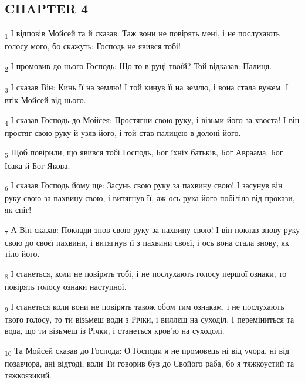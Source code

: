 \subsection{CHAPTER 4}
\begin{tcolorbox}
\textsubscript{1} І відповів Мойсей та й сказав: Таж вони не повірять мені, і не послухають голосу мого, бо скажуть: Господь не явився тобі!
\end{tcolorbox}
\begin{tcolorbox}
\textsubscript{2} І промовив до нього Господь: Що то в руці твоїй? Той відказав: Палиця.
\end{tcolorbox}
\begin{tcolorbox}
\textsubscript{3} І сказав Він: Кинь її на землю! І той кинув її на землю, і вона стала вужем. І втік Мойсей від нього.
\end{tcolorbox}
\begin{tcolorbox}
\textsubscript{4} І сказав Господь до Мойсея: Простягни свою руку, і візьми його за хвоста! І він простяг свою руку й узяв його, і той став палицею в долоні його.
\end{tcolorbox}
\begin{tcolorbox}
\textsubscript{5} Щоб повірили, що явився тобі Господь, Бог їхніх батьків, Бог Авраама, Бог Ісака й Бог Якова.
\end{tcolorbox}
\begin{tcolorbox}
\textsubscript{6} І сказав Господь йому ще: Засунь свою руку за пахвину свою! І засунув він руку свою за пахвину свою, і витягнув її, аж ось рука його побіліла від прокази, як сніг!
\end{tcolorbox}
\begin{tcolorbox}
\textsubscript{7} А Він сказав: Поклади знов свою руку за пахвину свою! І він поклав знову руку свою до своєї пахвини, і витягнув її з пахвини своєї, і ось вона стала знову, як тіло його.
\end{tcolorbox}
\begin{tcolorbox}
\textsubscript{8} І станеться, коли не повірять тобі, і не послухають голосу першої ознаки, то повірять голосу ознаки наступної.
\end{tcolorbox}
\begin{tcolorbox}
\textsubscript{9} І станеться коли вони не повірять також обом тим ознакам, і не послухають твого голосу, то ти візьмеш води з Річки, і виллєш на суходіл. І переміниться та вода, що ти візьмеш із Річки, і станеться кров'ю на суходолі.
\end{tcolorbox}
\begin{tcolorbox}
\textsubscript{10} Та Мойсей сказав до Господа: О Господи я не промовець ні від учора, ні від позавчора, ані відтоді, коли Ти говорив був до Свойого раба, бо я тяжкоустий та тяжкоязикий.
\end{tcolorbox}
